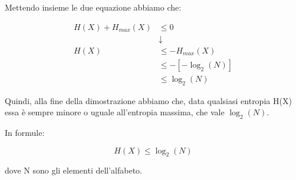 Mettendo insieme le due equazione abbiamo che: 

{
    \Large 
    \begin{equation}
        \begin{split}
            H(X) + H_{max} (X) &\le 0 
            \\
            &\downarrow
            \\
            H(X)  &\le - H_{max} (X)
            \\
            & \le - \left[ - \log_{2} (N)\right]
            \\
            & \le \log_{2} (N)
        \end{split}
    \end{equation}
}

Quindi, alla fine della dimostrazione abbiamo che, data qualsiasi entropia H(X) essa è sempre minore o uguale all'entropia massima, che vale $\log_{2} (N)$. \newline 

In formule:

{
    \Large 
    \begin{equation}
        H (X) \le \log_{2} (N)
    \end{equation}
}

dove N sono gli elementi dell'alfabeto. \newline 

